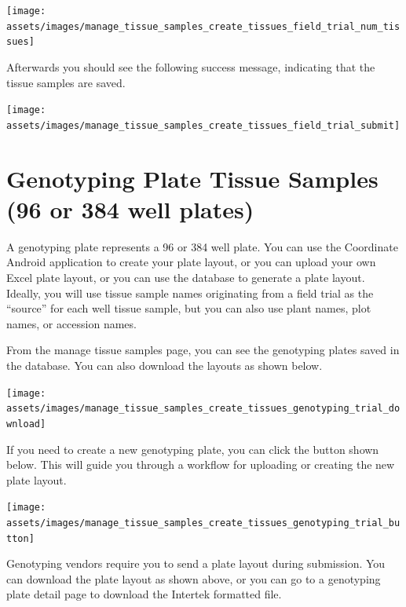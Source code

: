 \documentclass[
  12pt,
]{book}
\begin{document}
\begin{center}\texttt{[image: assets/images/manage\_tissue\_samples\_create\_tissues\_field\_trial\_num\_tissues]} \end{center}

Afterwards you should see the following success message, indicating that the tissue samples are saved.

\begin{center}\texttt{[image: assets/images/manage\_tissue\_samples\_create\_tissues\_field\_trial\_submit]} \end{center}

\hypertarget{genotyping-plate-tissue-samples-96-or-384-well-plates}{%
\section{Genotyping Plate Tissue Samples (96 or 384 well plates)}\label{genotyping-plate-tissue-samples-96-or-384-well-plates}}

A genotyping plate represents a 96 or 384 well plate. You can use the Coordinate Android application to create your plate layout, or you can upload your own Excel plate layout, or you can use the database to generate a plate layout. Ideally, you will use tissue sample names originating from a field trial as the ``source'' for each well tissue sample, but you can also use plant names, plot names, or accession names.

From the manage tissue samples page, you can see the genotyping plates saved in the database. You can also download the layouts as shown below.

\begin{center}\texttt{[image: assets/images/manage\_tissue\_samples\_create\_tissues\_genotyping\_trial\_download]} \end{center}

If you need to create a new genotyping plate, you can click the button shown below. This will guide you through a workflow for uploading or creating the new plate layout.

\begin{center}\texttt{[image: assets/images/manage\_tissue\_samples\_create\_tissues\_genotyping\_trial\_button]} \end{center}

Genotyping vendors require you to send a plate layout during submission. You can download the plate layout as shown above, or you can go to a genotyping plate detail page to download the Intertek formatted file.
\end{document}
